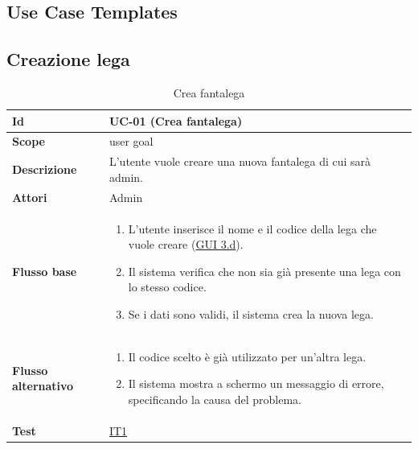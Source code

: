 
\subsection{Use Case Templates}

\subsection{Creazione lega}
\begin{table}[H]
\caption{Crea fantalega}
\label{UC-01}

\begin{tabularx}{\textwidth}{|l|X|}
\hline
\textbf{Id} & UC-01 (Crea fantalega) \\
\hline
\textbf{Scope} & user goal \\
\hline
\textbf{Descrizione} & L'utente vuole creare una nuova fantalega di cui sarà admin. \\
\hline
\textbf{Attori} & Admin \\
\hline
\textbf{Flusso base} &
\begin{enumerate}[leftmargin=*]
    \item L'utente inserisce il nome e il codice della lega che vuole creare (\hyperref[fig:mockup_parte3]{GUI 3.d}).
    \item Il sistema verifica che non sia già presente una lega con lo stesso codice.
    \item Se i dati sono validi, il sistema crea la nuova lega.
\end{enumerate} \\
\hline
\textbf{Flusso alternativo} &
\begin{enumerate}[leftmargin=*,label=2.\arabic*]
    \item Il codice scelto è già utilizzato per un'altra lega.
    \item Il sistema mostra a schermo un messaggio di errore, specificando la causa del problema.
\end{enumerate} \\
\hline
\textbf{Test} & \hyperref[IT1]{IT1} \\
\hline
\end{tabularx}

\end{table}


